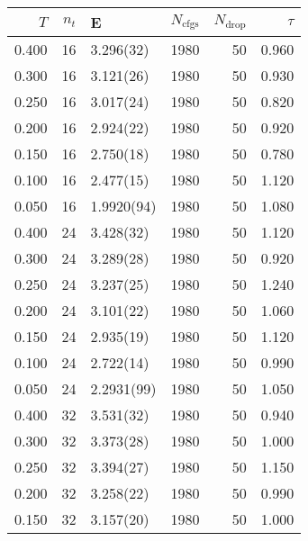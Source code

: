 \begin{tabular}{rrlrrr}
\hline
   $T$ &   $n_t$ & E          &   $N_\textrm{cfgs}$ &   $N_\textrm{drop}$ &   $\tau$ \\
\hline
 0.400 &      16 & 3.296(32)  &                1980 &                  50 &    0.960 \\
 0.300 &      16 & 3.121(26)  &                1980 &                  50 &    0.930 \\
 0.250 &      16 & 3.017(24)  &                1980 &                  50 &    0.820 \\
 0.200 &      16 & 2.924(22)  &                1980 &                  50 &    0.920 \\
 0.150 &      16 & 2.750(18)  &                1980 &                  50 &    0.780 \\
 0.100 &      16 & 2.477(15)  &                1980 &                  50 &    1.120 \\
 0.050 &      16 & 1.9920(94) &                1980 &                  50 &    1.080 \\
 0.400 &      24 & 3.428(32)  &                1980 &                  50 &    1.120 \\
 0.300 &      24 & 3.289(28)  &                1980 &                  50 &    0.920 \\
 0.250 &      24 & 3.237(25)  &                1980 &                  50 &    1.240 \\
 0.200 &      24 & 3.101(22)  &                1980 &                  50 &    1.060 \\
 0.150 &      24 & 2.935(19)  &                1980 &                  50 &    1.120 \\
 0.100 &      24 & 2.722(14)  &                1980 &                  50 &    0.990 \\
 0.050 &      24 & 2.2931(99) &                1980 &                  50 &    1.050 \\
 0.400 &      32 & 3.531(32)  &                1980 &                  50 &    0.940 \\
 0.300 &      32 & 3.373(28)  &                1980 &                  50 &    1.000 \\
 0.250 &      32 & 3.394(27)  &                1980 &                  50 &    1.150 \\
 0.200 &      32 & 3.258(22)  &                1980 &                  50 &    0.990 \\
 0.150 &      32 & 3.157(20)  &                1980 &                  50 &    1.000 \\

\end{tabular}
